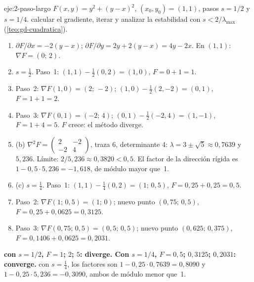 \begin{solucion}{eje:2-paso-largo}
\datos $F(x,y)=y^{2}+(y-x)^{2}$, $(x_0,y_0)=(1,1)$, pasos $s=1/2$ y $s=1/4$.
\planteamiento calcular el gradiente, iterar y analizar la estabilidad con $s<2/\lambda_{\max}$ (\cref{teo:gd-cuadratica}).
\pasos
\begin{enumerate}[label=\arabic*.]
  \item $\partial F/\partial x=-2(y-x)$; $\partial F/\partial y=2y+2(y-x)=4y-2x$. En $(1,1)$: $\nabla F=(0;\,2)$.
  \item $s=\frac12$. Paso~1: $(1,1)-\frac12(0,2)=(1,0)$, $F=0+1=1$.
  \item Paso~2: $\nabla F(1,0)=(2;\,-2)$; $(1,0)-\frac12(2,-2)=(0,1)$, $F=1+1=2$.
  \item Paso~3: $\nabla F(0,1)=(-2;\,4)$; $(0,1)-\frac12(-2,4)=(1,-1)$, $F=1+4=5$. $F$ crece: el método diverge.
  \item (b) $\nabla^{2}F=\begin{pmatrix}2&-2\\-2&4\end{pmatrix}$, traza 6, determinante 4: $\lambda=3\pm\sqrt5\approx 0{,}7639$ y $5{,}236$. Límite: $2/5{,}236\approx 0{,}3820<0{,}5$. El factor de la dirección rígida es $1-0{,}5\cdot 5{,}236=-1{,}618$, de módulo mayor que~1.
  \item (c) $s=\frac14$. Paso~1: $(1,1)-\frac14(0,2)=(1;\,0{,}5)$, $F=0{,}25+0{,}25=0{,}5$.
  \item Paso~2: $\nabla F(1;\,0{,}5)=(1;\,0)$; nuevo punto $(0{,}75;\,0{,}5)$, $F=0{,}25+0{,}0625=0{,}3125$.
  \item Paso~3: $\nabla F(0{,}75;\,0{,}5)=(0{,}5;\,0{,}5)$; nuevo punto $(0{,}625;\,0{,}375)$, $F=0{,}1406+0{,}0625=0{,}2031$.
\end{enumerate}
\resultado \textbf{con $s=1/2$, $F=1$; $2$; $5$: diverge. Con $s=1/4$, $F=0{,}5$; $0{,}3125$; $0{,}2031$: converge.}
\comprobacion con $s=\frac14$, los factores son $1-0{,}25\cdot 0{,}7639=0{,}8090$ y $1-0{,}25\cdot 5{,}236=-0{,}3090$, ambos de módulo menor que~1.
\end{solucion}

